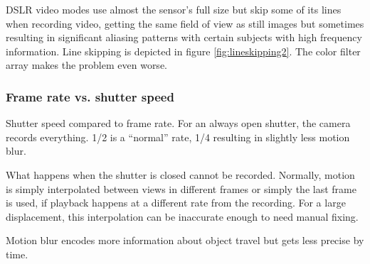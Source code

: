 DSLR video modes use almost the sensor's full size but skip some of its lines when recording video, getting the same field of view as still images but sometimes resulting in significant aliasing patterns with certain subjects with high frequency information.
Line skipping is depicted in figure \ref{fig:lineskipping2}.
The color filter array makes the problem even worse.



\subsubsection{Frame rate vs. shutter speed} %

{Shutter speed compared to frame rate. For an always open shutter, the camera records everything. 1/2 is a ``normal'' rate, 1/4 resulting in slightly less motion blur.}

What happens when the shutter is closed cannot be recorded.
Normally, motion is simply interpolated between views in different frames or simply the last frame is used, if playback happens at a different rate from the recording.
For a large displacement, this interpolation can be inaccurate enough to need manual fixing.

Motion blur encodes more information about object travel but gets less precise by time.

